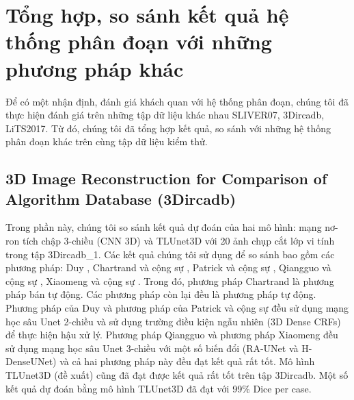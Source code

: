 \chapter{Tổng hợp, so sánh kết quả hệ thống phân đoạn với những phương pháp khác}
Để có một nhận định, đánh giá khách quan với hệ thống phân đoạn, chúng tôi đã thực hiện đánh giá trên những tập dữ liệu khác nhau SLIVER07, 3Dircadb,  LiTS2017. Từ đó, chúng tôi đã tổng hợp kết quả, so sánh với những hệ thống phân đoạn khác trên cùng tập dữ liệu kiểm thử.
\section{3D Image Reconstruction for Comparison of Algorithm Database (3Dircadb)}
Trong phần này, chúng tôi so sánh kết quả dự đoán của hai mô hình: mạng nơ-ron tích chập 3-chiều (CNN 3D) và TLUnet3D với 20 ảnh chụp cắt lớp vi tính trong tập 3Dircadb\_1. Các kết quả chúng tôi sử dụng để so sánh bao gồm các phương pháp: Duy \cite{Duy_paper}, Chartrand và cộng sự \cite{Chartrand_paper}, Patrick và cộng sự \cite{Patrick_paper}, Qiangguo và cộng sự  \cite{Qiangguo_paper}, Xiaomeng và cộng sự  \cite{Xiaomeng_paper}. Trong đó, phương pháp Chartrand \cite{Chartrand_paper} là phương pháp bán tự động. Các phương pháp còn lại đều là phương pháp tự động. Phương pháp của Duy \cite{Duy_paper} và phương pháp của Patrick và cộng sự\cite{Patrick_paper} đều sử dụng mạng học sâu Unet 2-chiều và sử dụng trường điều kiện ngẫu nhiên (3D Dense CRFs) để thực hiện hậu xử lý. Phương pháp Qiangguo\cite{Qiangguo_paper} và phương pháp Xiaomeng \cite{Xiaomeng_paper} đều sử dụng mạng học sâu Unet 3-chiều với một số biến đổi (RA-UNet và H-DenseUNet) và cả hai phương pháp này đều đạt kết quả rất tốt. Mô hình TLUnet3D (đề xuất) cũng đã đạt được kết quả rất tốt trên tập 3Dircadb. Một số kết quả dự đoán bằng mô hình TLUnet3D đã đạt với 99\%  Dice per case.
